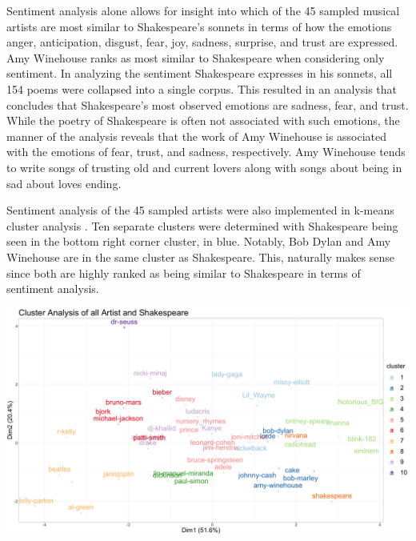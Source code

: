 \documentclass[10pt,a4paper]{article}
\begin{document}


\noindent Sentiment analysis alone allows for insight into which of the 45 sampled musical artists are most similar to Shakespeare’s sonnets in terms of how the emotions anger, anticipation, disgust, fear, joy, sadness, surprise, and trust are expressed. Amy Winehouse ranks as most similar to Shakespeare when considering only sentiment. In analyzing the sentiment Shakespeare expresses in his sonnets, all 154 poems were collapsed into a single corpus. This resulted in an analysis that concludes that Shakespeare’s most observed emotions are sadness, fear, and trust. While the poetry of Shakespeare is often not associated with such emotions, the manner of the analysis reveals that the work of Amy Winehouse is associated with the emotions of fear, trust, and sadness, respectively. Amy Winehouse tends to write songs of trusting old and current lovers along with songs about being in sad about loves ending. 

  

\noindent Sentiment analysis of the 45 sampled artists were also implemented in k-means cluster analysis . Ten separate clusters were determined with Shakespeare being seen in the bottom right corner cluster, in blue. Notably, Bob Dylan and Amy Winehouse are in the same cluster as Shakespeare. This, naturally makes sense since both are highly ranked as being similar to Shakespeare in terms of sentiment analysis. 

\begin{center}
\includegraphics[width=14cm]{_assets/ClusterAnalysis_Fit10.png}
\end{center}
\end{document}
